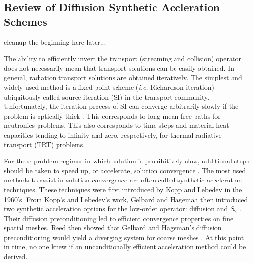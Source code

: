 \subsection{Review of Diffusion Synthetic Accleration Schemes}
\label{sec::DSA_Introduction_History}

cleanup the beginning here later...

The ability to efficiently invert the transport (streaming and collision) operator does not necessarily mean that transport solutions can be easily obtained. In general, radiation transport solutions are obtained iteratively. The simplest and widely-used method is a fixed-point scheme ({\em i.e.} Richardson iteration) ubiquitously called source iteration (SI) in the transport community. Unfortunately, the iteration process of SI can converge arbitrarily slowly if the problem is optically thick \cite{ref::adams_larsen_iter_methods}. This corresponds to long mean free paths for neutronics problems. This also corresponds to time steps and material heat capacities tending to infinity and zero, respectively, for thermal radiative transport (TRT) problems.

For these problem regimes in which solution is prohibitively slow, additional steps should be taken to speed up, or accelerate, solution convergence \cite{ref::adams_larsen_iter_methods}. The most used methods to assist in solution convergence are often called synthetic acceleration techniques. These techniques were first introduced by Kopp \cite{kopp1963synthetic} and Lebedev \cite{lebedevI,lebedevII,lebedevIII,lebedevIV,lebedevV,lebedevVI,lebedevVII} in the 1960's. From Kopp's and Lebedev's work, Gelbard and Hageman then introduced two synthetic acceleration options for the low-order operator: diffusion and $S_2$ \cite{gelbard1969synthetic}. Their diffusion preconditioning led to efficient convergence properties on fine spatial meshes. Reed then showed that Gelbard and Hageman's diffusion preconditioning would yield a diverging system for coarse meshes \cite{reed1971effectiveness}. At this point in time, no one knew if an unconditionally efficient acceleration method could be derived.

